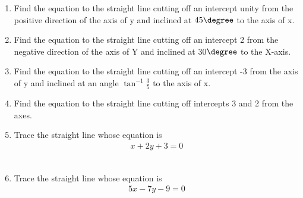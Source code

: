 \renewcommand{\theequation}{\theenumi}
\renewcommand{\thefigure}{\theenumi}
\begin{enumerate}[label=\thesubsection.\arabic*.,ref=\thesubsection.\theenumi]
%
\item Find the equation to the straight line cutting off an intercept unity from the positive direction of the
axis of y and inclined at $45\degree$   to the axis of x.
\\
\solution

%
\item Find the equation to the straight line cutting off an intercept 2 from the negative direction of the axis of Y and inclined at 30$\degree$ to the X-axis.
\\
\solution


\item Find the equation to the straight line cutting off an intercept -3 from the axis of y and inclined at an angle $\tan^{-1}\frac{3}{5}$ to the axis of x.
%
\\
\solution



\item Find the equation to the straight line cutting off intercepts 3 and 2 from the axes.
%
\\
\solution

%
\item Trace the straight line whose equation is \\
\begin{align}
x + 2y+3 = 0
\end{align}
\\
\solution


\item  Trace the straight line whose equation is
\begin{align}
5x - 7y -9 = 0
\end{align}
%
\\
\solution

\end{enumerate}
